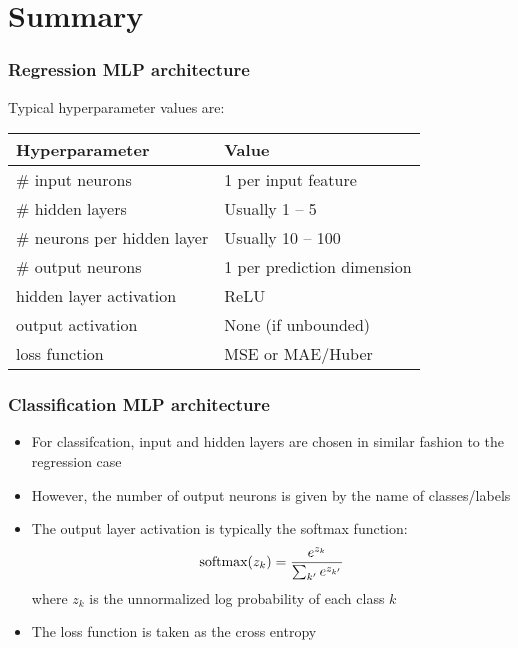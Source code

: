 \documentclass[smaller]{beamer}
\begin{document}
   





\section{Summary}

\begin{frame}
  \frametitle{Regression MLP architecture}
  \pause
  Typical hyperparameter values are: \pause

  \begin{table}\centering
  \begin{tabular}[t]{l l}
    \bf Hyperparameter & \bf Value \\\midrule
    \# input neurons & 1 per input feature \\[2mm]\pause
    \# hidden layers & Usually 1 -- 5 \\[2mm]\pause
    \# neurons per hidden layer & Usually 10 -- 100 \\[2mm]\pause
    \# output neurons & 1 per prediction dimension \\[2mm]\pause
    hidden layer activation & ReLU \\[2mm]\pause
    output activation & None (if unbounded) \\[2mm]\pause
    loss function & MSE or MAE/Huber
  \end{tabular}
\end{table}
\end{frame}

\begin{frame}
  \frametitle{Classification MLP architecture}
  \pause
  \begin{itemize}
  \item For classifcation, input and hidden layers are chosen in similar fashion to the regression case

    \pause

  \item However, the number of output neurons is given by the name of classes/labels

  \item The output layer activation is typically the softmax function:
    \begin{equation}
      \text{softmax}(z_{k}) = \frac{e^{z_{k}}}{\sum_{k'}e^{z_{k'}}}
    \end{equation}
    where $z_{k}$ is the unnormalized log probability of each class $k$
    
    \pause
    
  \item The loss function is taken as the cross entropy 
  \end{itemize}
\end{frame}
\end{document}
